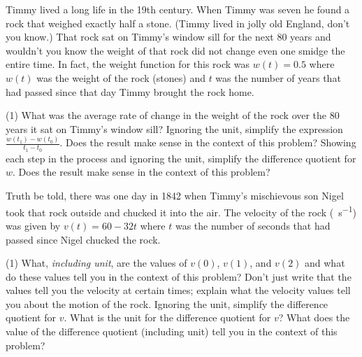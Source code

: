 \documentclass[12pt,]{book}
\theoremstyle{plain}
\theoremstyle{definition}
\numberwithin{equation}{section}
\newcommand{\fe}[2]{#1\mathopen{}\left(#2\right)\mathclose{}}
\begin{document}
\hypertarget{exercisegroup-6}{\null}Timmy lived a long life in the 19th century. When Timmy was seven he found a rock that weighed exactly half a stone. (Timmy lived in jolly old England, don't you know.) That rock sat on Timmy's window sill for the next 80 years and wouldn't you know the weight of that rock did not change even one smidge the entire time. In fact, the weight function for this rock was \(\fe{w}{t}=0.5\) where \(\fe{w}{t}\) was the weight of the rock (stones) and \(t\) was the number of years that had passed since that day Timmy brought the rock home.%
\par
\begin{exercisegroup}(1)
\exercise[12.]\hypertarget{exercise-20}{\null}What was the average rate of change in the weight of the rock over the 80 years it sat on Timmy's window sill?%
\exercise[13.]\hypertarget{exercise-21}{\null}Ignoring the unit, simplify the expression \(\frac{\fe{w}{t_1}-\fe{w}{t_0}}{t_1-t_0}\). Does the result make sense in the context of this problem?%
\exercise[14.]\hypertarget{exercise-22}{\null}Showing each step in the process and ignoring the unit, simplify the difference quotient for \(w\). Does the result make sense in the context of this problem?%
\end{exercisegroup}
\par\smallskip\noindent
\hypertarget{exercisegroup-7}{\null}Truth be told, there was one day in 1842 when Timmy's mischievous son Nigel took that rock outside and chucked it into the air. The velocity of the rock (\si{\foot\per\second}) was given by \(\fe{v}{t}=60-32t\) where \(t\) was the number of seconds that had passed since Nigel chucked the rock.%
\par
\begin{exercisegroup}(1)
\exercise[15.]\hypertarget{exercise-23}{\null}What, \emph{including unit}, are the values of \(\fe{v}{0}\), \(\fe{v}{1}\), and \(\fe{v}{2}\) and what do these values tell you in the context of this problem? Don't just write that the values tell you the velocity at certain times; explain what the velocity values tell you about the motion of the rock.%
\exercise[16.]\hypertarget{exercise-24}{\null}Ignoring the unit, simplify the difference quotient for \(v\).%
\exercise[17.]\hypertarget{exercise-25}{\null}What is the unit for the difference quotient for \(v\)? What does the value of the difference quotient (including unit) tell you in the context of this problem?%
\end{exercisegroup}
\par\smallskip\noindent
\end{document}
